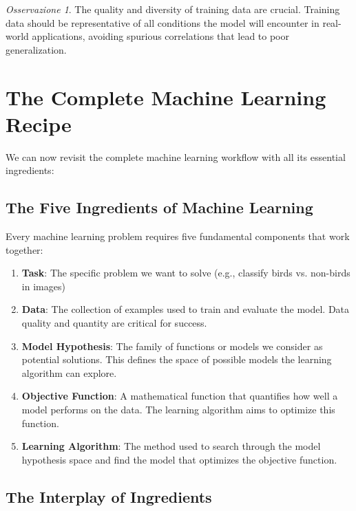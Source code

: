 \documentclass[11pt,a4paper]{article}
\theoremstyle{definition}
\theoremstyle{plain}
\theoremstyle{remark}
\newtheorem*{observation}{Osservazione}
\begin{document}
\begin{observation}
The quality and diversity of training data are crucial. Training data should be representative of all conditions the model will encounter in real-world applications, avoiding spurious correlations that lead to poor generalization.
\end{observation}

\section{The Complete Machine Learning Recipe}

We can now revisit the complete machine learning workflow with all its essential ingredients:

\subsection{The Five Ingredients of Machine Learning}

Every machine learning problem requires five fundamental components that work together:

\begin{enumerate}
    \item \textbf{Task}: The specific problem we want to solve (e.g., classify birds vs. non-birds in images)
    
    \item \textbf{Data}: The collection of examples used to train and evaluate the model. Data quality and quantity are critical for success.
    
    \item \textbf{Model Hypothesis}: The family of functions or models we consider as potential solutions. This defines the space of possible models the learning algorithm can explore.
    
    \item \textbf{Objective Function}: A mathematical function that quantifies how well a model performs on the data. The learning algorithm aims to optimize this function.
    
    \item \textbf{Learning Algorithm}: The method used to search through the model hypothesis space and find the model that optimizes the objective function.
\end{enumerate}

\subsection{The Interplay of Ingredients}
\end{document}
